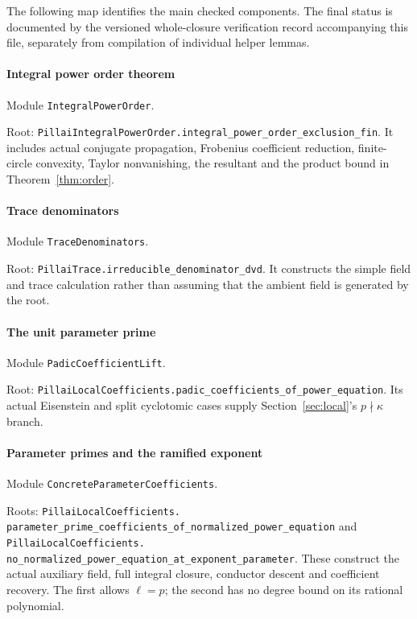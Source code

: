 \documentclass[11pt,letterpaper]{article}
\theoremstyle{remark}\newtheorem{remark}[theorem]{Remark}
\newcommand{\lean}[1]{{\small\urlstyle{tt}\nolinkurl{#1}}}
\begin{document}
The following map identifies the main checked components. The final status
is documented by the versioned whole-closure verification record accompanying
this file, separately from compilation of individual helper lemmas.
\begingroup\raggedright
\paragraph{Integral power order theorem}\mbox{}\par\noindent
Module \lean{IntegralPowerOrder}.\par\noindent Root:
\lean{PillaiIntegralPowerOrder.integral_power_order_exclusion_fin}.
It includes actual conjugate propagation, Frobenius coefficient reduction,
finite-circle convexity, Taylor nonvanishing, the resultant and the product
bound in Theorem~\ref{thm:order}.
\paragraph{Trace denominators}\mbox{}\par\noindent
Module \lean{TraceDenominators}.\par\noindent Root:
\lean{PillaiTrace.irreducible_denominator_dvd}.
It constructs the simple field and trace calculation rather than assuming
that the ambient field is generated by the root.
\paragraph{The unit parameter prime}\mbox{}\par\noindent
Module \lean{PadicCoefficientLift}.\par\noindent Root:
\lean{PillaiLocalCoefficients.padic_coefficients_of_power_equation}.
Its actual Eisenstein and split cyclotomic cases supply Section~\ref{sec:local}'s
$p\nmid\kappa$ branch.
\paragraph{Parameter primes and the ramified exponent}\mbox{}\par\noindent
Module \lean{ConcreteParameterCoefficients}.\par\noindent Roots:
\lean{PillaiLocalCoefficients.}\allowbreak
\lean{parameter_prime_coefficients_of_normalized_power_equation}
and
\lean{PillaiLocalCoefficients.}\allowbreak
\lean{no_normalized_power_equation_at_exponent_parameter}.
These construct the actual auxiliary field, full integral closure,
conductor descent and coefficient recovery. The first allows $\ell=p$;
the second has no degree bound on its rational polynomial.
\end{document}

